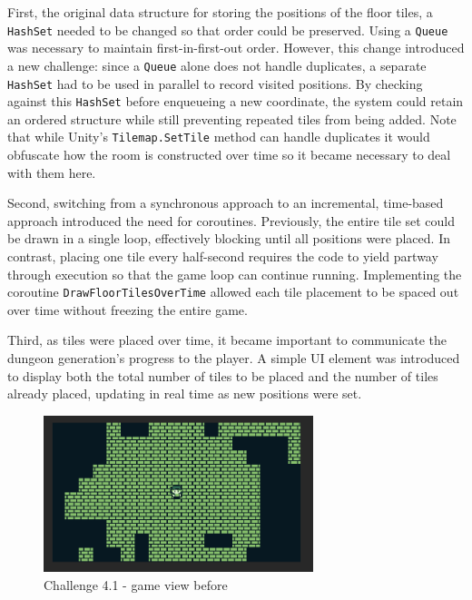 \documentclass[a4paper, 12pt, one column, aas_macros]{article}
\begin{document}
First, the original data structure for storing the positions of the floor tiles, a \texttt{HashSet} needed to be changed so that order could be preserved. Using a \texttt{Queue} was necessary to maintain first-in-first-out order. However, this change introduced a new challenge: since a \texttt{Queue} alone does not handle duplicates, a separate \texttt{HashSet} had to be used in parallel to record visited positions. By checking against this \texttt{HashSet} before enqueueing a new coordinate, the system could retain an ordered structure while still preventing repeated tiles from being added. Note that while Unity's \texttt{Tilemap.SetTile} method can handle duplicates it would obfuscate how the room is constructed over time so it became necessary to deal with them here. 

Second, switching from a synchronous approach to an incremental, time-based approach introduced the need for coroutines. Previously, the entire tile set could be drawn in a single loop, effectively blocking until all positions were placed. In contrast, placing one tile every half-second requires the code to yield partway through execution so that the game loop can continue running. Implementing the coroutine \texttt{DrawFloorTilesOverTime} allowed each tile placement to be spaced out over time without freezing the entire game.

Third, as tiles were placed over time, it became important to communicate the dungeon generation’s progress to the player. A simple UI element was introduced to display both the total number of tiles to be placed and the number of tiles already placed, updating in real time as new positions were set.

\begin{figure}[htbp]
  \centering
  \includegraphics[width=0.7\textwidth]{images/difficulty-1-before.png}
  \caption{Challenge 4.1 - game view before}
  \label{fig:difficulty-1-before}
\end{figure}
\end{document}

